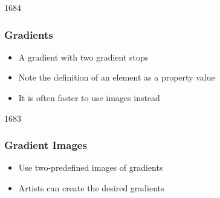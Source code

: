 
\begin{slide}{1684}\frametitle{Gradients}


\begin{itemize}
\item A gradient with two gradient stops
\item Note the definition of an element as a property value
\item It is often faster to use images instead
\end{itemize}                                


\end{slide}


\begin{slide}{1683}\frametitle{Gradient Images}


\begin{itemize}
\item Use two-predefined images of gradients
\item Artists can create the desired gradients
\end{itemize}

\end{slide}

